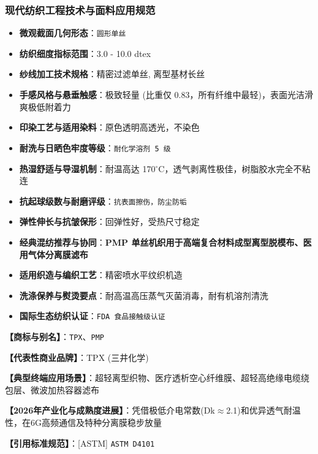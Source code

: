 \documentclass[11pt,openright,twoside,UTF8]{ctexbook}
\begin{document}
\subsubsection*{现代纺织工程技术与面料应用规范}
\begin{itemize} \setlength{\itemsep}{2pt}
    \item \textbf{微观截面几何形态}：\texttt{圆形单丝}
    \item \textbf{纺织细度指标范围}：3.0 - 10.0 dtex
    \item \textbf{纱线加工技术规格}：精密过滤单丝, 离型基材长丝
    \item \textbf{手感风格与悬垂触感}：极致轻量 (比重仅 0.83，所有纤维中最轻)，表面光洁滑爽极低附着力
    \item \textbf{印染工艺与适用染料}：原色透明高透光，不染色
    \item \textbf{耐洗与日晒色牢度等级}：\texttt{耐化学溶剂 5 级}
    \item \textbf{热湿舒适与导湿机制}：耐温高达 170$^\circ\mathrm{C}$，透气剥离性极佳，树脂胶水完全不粘连
    \item \textbf{抗起球级数与耐磨评级}：\texttt{抗表面擦伤，防尘防垢}
    \item \textbf{弹性伸长与抗皱保形}：回弹性好，受热尺寸稳定
    \item \textbf{经典混纺推荐与协同}：\textbf{PMP 单丝机织用于高端复合材料成型离型脱模布、医用气体分离膜滤布}
    \item \textbf{适用织造与编织工艺}：精密喷水平纹织机造
    \item \textbf{洗涤保养与熨烫要点}：耐高温高压蒸气灭菌消毒，耐有机溶剂清洗
    \item \textbf{国际生态纺织认证}：\texttt{FDA 食品接触级认证}
\end{itemize}
\vspace{0.2cm}

\noindent\textbf{【商标与别名】}：\texttt{TPX}、\texttt{PMP}\par
\noindent\textbf{【代表性商业品牌】}：TPX (三井化学)\par
\noindent\textbf{【典型终端应用场景】}：超轻离型织物、医疗透析空心纤维膜、超轻高绝缘电缆绕包层、微波加热容器滤布\par
\noindent\textbf{【2026年产业化与成熟度进展】}：凭借极低介电常数(Dk$\approx$2.1)和优异透气耐温性，在6G高频通信及特种分离膜稳步放量\par
\noindent\textbf{【引用标准规范】}：[ASTM] \texttt{ASTM D4101}\par
\vspace{0.5cm}
\end{document}
